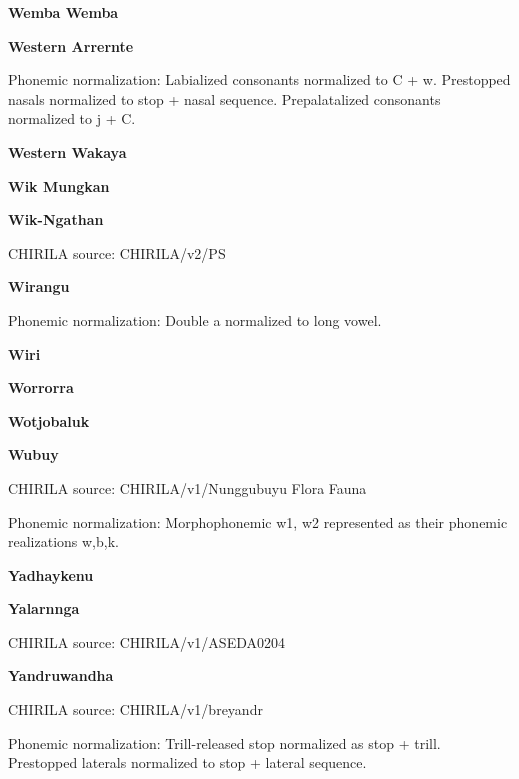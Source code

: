 \textbf{Wemba Wemba}


\textbf{Western Arrernte}


Phonemic normalization: Labialized consonants normalized to C + w.
Prestopped nasals normalized to stop + nasal sequence. Prepalatalized
consonants normalized to j + C.

\textbf{Western Wakaya}


\textbf{Wik Mungkan}


\textbf{Wik-Ngathan}

CHIRILA source: CHIRILA/v2/PS


\textbf{Wirangu}


Phonemic normalization: Double a normalized to long vowel.

\textbf{Wiri}


\textbf{Worrorra}


\textbf{Wotjobaluk}


\textbf{Wubuy}

CHIRILA source: CHIRILA/v1/Nunggubuyu Flora Fauna


Phonemic normalization: Morphophonemic w1, w2 represented as their
phonemic realizations w,b,k.

\textbf{Yadhaykenu}


\textbf{Yalarnnga}

CHIRILA source: CHIRILA/v1/ASEDA0204


\textbf{Yandruwandha}

CHIRILA source: CHIRILA/v1/breyandr


Phonemic normalization: Trill-released stop normalized as stop + trill.
Prestopped laterals normalized to stop + lateral sequence.

